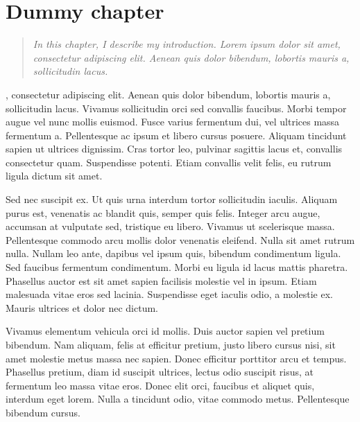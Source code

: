 
\chapter{Dummy chapter}

\begin{quote}
\textit{In this chapter, I describe my introduction. Lorem ipsum dolor sit amet, consectetur adipiscing elit. Aenean quis dolor bibendum, lobortis mauris a, sollicitudin lacus.}
\end{quote}

, consectetur adipiscing elit. Aenean quis dolor bibendum, lobortis mauris a, sollicitudin lacus. Vivamus sollicitudin orci sed convallis faucibus. Morbi tempor augue vel nunc mollis euismod. Fusce varius fermentum dui, vel ultrices massa fermentum a.   Pellentesque ac ipsum et libero cursus posuere. Aliquam tincidunt sapien ut ultrices dignissim. Cras tortor leo, pulvinar sagittis lacus et, convallis consectetur quam. Suspendisse potenti. Etiam convallis velit felis, eu rutrum ligula dictum sit amet.

Sed nec suscipit ex. Ut quis urna interdum tortor sollicitudin iaculis. Aliquam purus est, venenatis ac blandit quis, semper quis felis. Integer arcu augue, accumsan at vulputate sed, tristique eu libero.\autocite{Aghaeepour2013} Vivamus ut scelerisque massa. Pellentesque commodo arcu mollis dolor venenatis eleifend. Nulla sit amet rutrum nulla. Nullam leo ante, dapibus vel ipsum quis, bibendum condimentum ligula. Sed faucibus fermentum condimentum. Morbi eu ligula id lacus mattis pharetra. Phasellus auctor est sit amet sapien facilisis molestie vel in ipsum. Etiam malesuada vitae eros sed lacinia.\autocite{Rolph2015} Suspendisse eget iaculis odio, a molestie ex. Mauris ultrices et dolor nec dictum.\autocite{Rolph2015}

Vivamus elementum vehicula orci id mollis.\autocite{Aghaeepour2013,Gelman2006} Duis auctor sapien vel pretium bibendum. Nam aliquam, felis at efficitur pretium, justo libero cursus nisi, sit amet molestie metus massa nec sapien. Donec efficitur porttitor arcu et tempus. Phasellus pretium, diam id suscipit ultrices, lectus odio suscipit risus, at fermentum leo massa vitae eros. Donec elit orci, faucibus et aliquet quis, interdum eget lorem. Nulla a tincidunt odio, vitae commodo metus. Pellentesque bibendum cursus.\autocite{Rolph2015}

